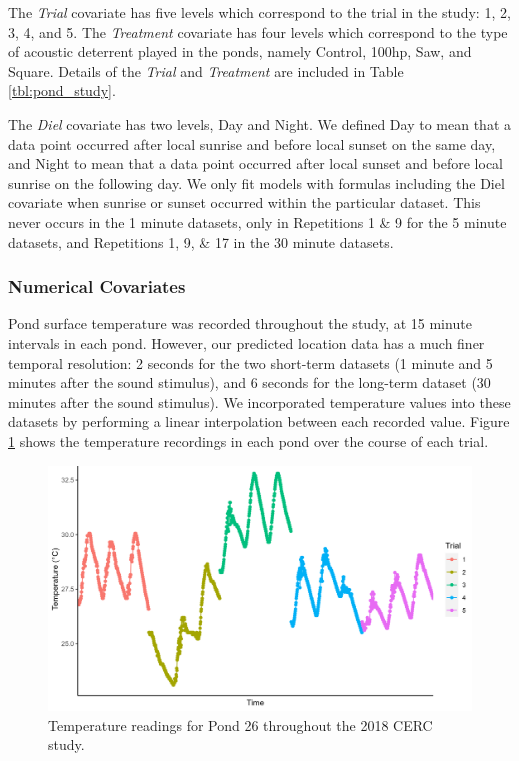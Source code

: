 \documentclass[12pt]{article}
\begin{document}
	The \emph{Trial} covariate has five levels which correspond to the trial in the study: 1, 2, 3, 4, and 5. The \emph{Treatment} covariate has four levels which correspond to the type of acoustic deterrent played in the ponds, namely Control, 100hp, Saw, and Square. Details of the \emph{Trial} and \emph{Treatment} are included in Table \ref{tbl:pond_study}.
	
	The \emph{Diel} covariate has two levels, Day and Night. We defined Day to mean that a data point occurred after local sunrise and before local sunset on the same day, and Night to mean that a data point occurred after local sunset and before local sunrise on the following day. We only fit models with formulas including the Diel covariate when sunrise or sunset occurred within the particular dataset. This never occurs in the 1 minute datasets, only in Repetitions 1 \& 9 for the 5 minute datasets, and Repetitions 1, 9, \& 17 in the 30 minute datasets.
	
	\subsubsection{Numerical Covariates} \label{sec:num-cov}
	
	Pond surface temperature was recorded throughout the study, at 15 minute intervals in each pond. However, our predicted location data has a much finer temporal resolution: 2 seconds for the two short-term datasets (1 minute and 5 minutes after the sound stimulus), and 6 seconds for the long-term dataset (30 minutes after the sound stimulus). We incorporated temperature values into these datasets by performing a linear interpolation between each recorded value. Figure \ref{img:temperature} shows the temperature recordings in each pond over the course of each trial.
	
	\begin{figure}
		\includegraphics[width=\textwidth]{pond_26_temp.png}
		\caption{Temperature readings for Pond 26 throughout the 2018 CERC study.}
		\label{img:temperature}
	\end{figure}
	
\end{document}
